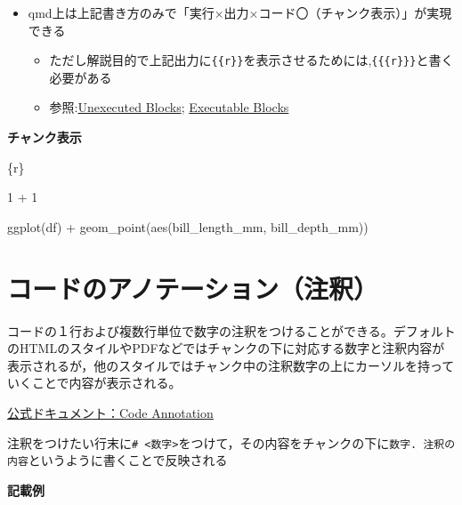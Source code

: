 \documentclass[
  b5paper,
  xelatex, ja=standard]{bxjsbook}
\newenvironment{Shaded}{\begin{snugshade}}{\end{snugshade}}
\newcommand{\InformationTok}[1]{\textcolor[rgb]{0.37,0.37,0.37}{#1}}
\providecommand{\tightlist}{%
  \setlength{\itemsep}{0pt}\setlength{\parskip}{0pt}}\usepackage{longtable,booktabs,array}
\begin{document}
\begin{itemize}
\tightlist
\item
  qmd上は上記書き方のみで「実行×\textbar 出力×\textbar コード〇（チャンク表示）」が実現できる

  \begin{itemize}
  \tightlist
  \item
    ただし解説目的で上記出力に\texttt{\{\{r\}\}}を表示させるためには,\texttt{\{\{\{r\}\}\}}と書く必要がある
  \item
    参照:\href{https://quarto.org/docs/computations/execution-options.html\#unexecuted-blocks}{Unexecuted
    Blocks};
    \href{https://quarto.org/docs/output-formats/html-code.html\#executable-blocks}{Executable
    Blocks}
  \end{itemize}
\end{itemize}

\textbf{チャンク表示}

\begin{Shaded}
\begin{Highlighting}[]
\InformationTok{\textasciigrave{}\textasciigrave{}\textasciigrave{}\{r\}}


\InformationTok{1 + 1}


\InformationTok{ggplot(df) +}
\InformationTok{  geom\_point(aes(bill\_length\_mm, bill\_depth\_mm))}
\InformationTok{\textasciigrave{}\textasciigrave{}\textasciigrave{}}
\end{Highlighting}
\end{Shaded}

\section{コードのアノテーション（注釈）}\label{ux30b3ux30fcux30c9ux306eux30a2ux30ceux30c6ux30fcux30b7ux30e7ux30f3ux6ce8ux91c8}

コードの１行および複数行単位で数字の注釈をつけることができる。デフォルトのHTMLのスタイルやPDFなどではチャンクの下に対応する数字と注釈内容が表示されるが，他のスタイルではチャンク中の注釈数字の上にカーソルを持っていくことで内容が表示される。

\href{https://quarto.org/docs/authoring/code-annotation.html}{公式ドキュメント：Code
Annotation}

注釈をつけたい行末に\texttt{\#\ \textless{}数字\textgreater{}}をつけて，その内容をチャンクの下に\texttt{数字.\ 注釈の内容}というように書くことで反映される

\textbf{記載例}
\end{document}

